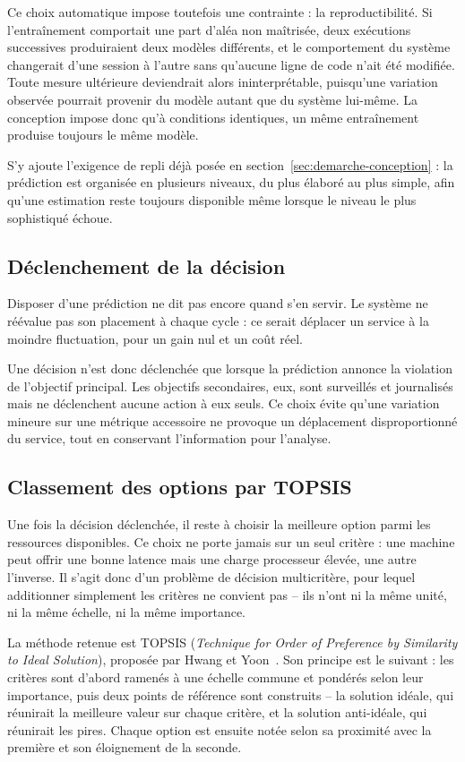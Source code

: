 Ce choix automatique impose toutefois une contrainte : la reproductibilité. Si l'entraînement comportait une part d'aléa non maîtrisée, deux exécutions successives produiraient deux modèles différents, et le comportement du système changerait d'une session à l'autre sans qu'aucune ligne de code n'ait été modifiée. Toute mesure ultérieure deviendrait alors ininterprétable, puisqu'une variation observée pourrait provenir du modèle autant que du système lui-même. La conception impose donc qu'à conditions identiques, un même entraînement produise toujours le même modèle.

S'y ajoute l'exigence de repli déjà posée en section~\ref{sec:demarche-conception} : la prédiction est organisée en plusieurs niveaux, du plus élaboré au plus simple, afin qu'une estimation reste toujours disponible même lorsque le niveau le plus sophistiqué échoue.

\subsection{Déclenchement de la décision}

Disposer d'une prédiction ne dit pas encore quand s'en servir. Le système ne réévalue pas son placement à chaque cycle : ce serait déplacer un service à la moindre fluctuation, pour un gain nul et un coût réel.

Une décision n'est donc déclenchée que lorsque la prédiction annonce la violation de l'objectif principal. Les objectifs secondaires, eux, sont surveillés et journalisés mais ne déclenchent aucune action à eux seuls. Ce choix évite qu'une variation mineure sur une métrique accessoire ne provoque un déplacement disproportionné du service, tout en conservant l'information pour l'analyse.

\subsection{Classement des options par TOPSIS}

Une fois la décision déclenchée, il reste à choisir la meilleure option parmi les ressources disponibles. Ce choix ne porte jamais sur un seul critère : une machine peut offrir une bonne latence mais une charge processeur élevée, une autre l'inverse. Il s'agit donc d'un problème de décision multicritère, pour lequel additionner simplement les critères ne convient pas -- ils n'ont ni la même unité, ni la même échelle, ni la même importance.

La méthode retenue est TOPSIS (\emph{Technique for Order of Preference by Similarity to Ideal Solution}), proposée par Hwang et Yoon~\cite{hwang1981topsis}. Son principe est le suivant : les critères sont d'abord ramenés à une échelle commune et pondérés selon leur importance, puis deux points de référence sont construits -- la solution idéale, qui réunirait la meilleure valeur sur chaque critère, et la solution anti-idéale, qui réunirait les pires. Chaque option est ensuite notée selon sa proximité avec la première et son éloignement de la seconde.

